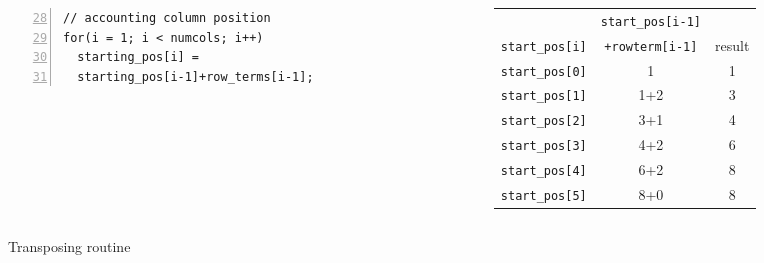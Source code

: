 \documentclass[newPxFont,sthlmFooter,nooffset]{beamer}
\begin{document}
\begin{frame}
\begin{columns}
\begin{column}{0.5\textwidth}
\begin{lstlisting}[frame=single, lineskip = -1pt, numbers = left, firstnumber=28, framexleftmargin=15pt, framexrightmargin=-5pt, xleftmargin = 25pt ]
// accounting column position 
for(i = 1; i < numcols; i++)
  starting_pos[i] = 
  starting_pos[i-1]+row_terms[i-1];
\end{lstlisting}      
  \end{column}
  \begin{column}{0.5\textwidth}
    {\scriptsize
\begin{tabular} {l | c | c}
                       &  \texttt{start\_pos[i-1]} & \\
\texttt{start\_pos[i]} &     \texttt{+rowterm[i-1]} & result \\ \hline
\texttt{start\_pos[0]} & 1 & 1\\
\texttt{start\_pos[1]} & 1+2 & 3\\
\texttt{start\_pos[2]} & 3+1& 4\\
\texttt{start\_pos[3]} & 4+2& 6\\
\texttt{start\_pos[4]} & 6+2& 8\\
\texttt{start\_pos[5]} & 8+0& 8\\
\end{tabular}
    }    
  \end{column}
\end{columns}


Transposing routine


\end{frame}
\end{document}
